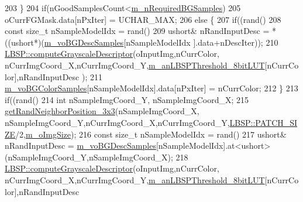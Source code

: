 \begin{DoxyCode}
203             \}
204             \textcolor{keywordflow}{if}(nGoodSamplesCount<\mbox{\hyperlink{class_background_subtractor_l_o_b_s_t_e_r_acb558aefc1b6205a63c1906b6fd1eeff}{m\_nRequiredBGSamples}})
205                 oCurrFGMask.data[nPxIter] = UCHAR\_MAX;
206             \textcolor{keywordflow}{else} \{
207                 \textcolor{keywordflow}{if}((rand()%
208                     \textcolor{keyword}{const} \textcolor{keywordtype}{size\_t} nSampleModelIdx = rand()%
209                     ushort& nRandInputDesc = *((ushort*)(\mbox{\hyperlink{class_background_subtractor_l_o_b_s_t_e_r_a3c49866ae652423b2173215957907d04}{m\_voBGDescSamples}}[nSampleModelIdx
      ].data+nDescIter));
210                     \mbox{\hyperlink{class_l_b_s_p_a4a5f635868b6b81ba53df2692ee3dfd8}{LBSP::computeGrayscaleDescriptor}}(oInputImg,nCurrColor,
      nCurrImgCoord\_X,nCurrImgCoord\_Y,\mbox{\hyperlink{class_background_subtractor_l_b_s_p_aefe69d94f08b2c4ba73ad1d254ad9153}{m\_anLBSPThreshold\_8bitLUT}}[nCurrColor],nRandInputDesc
      );
211                     \mbox{\hyperlink{class_background_subtractor_l_o_b_s_t_e_r_ac981b39f8ae7b28d3e4326d8e6be6332}{m\_voBGColorSamples}}[nSampleModelIdx].data[nPxIter] = nCurrColor;
212                 \}
213                 \textcolor{keywordflow}{if}((rand()%
214                     \textcolor{keywordtype}{int} nSampleImgCoord\_Y, nSampleImgCoord\_X;
215                     \mbox{\hyperlink{_rand_utils_8h_a76b18bef397ed044a6db9e3a63c69f69}{getRandNeighborPosition\_3x3}}(nSampleImgCoord\_X,
      nSampleImgCoord\_Y,nCurrImgCoord\_X,nCurrImgCoord\_Y,\mbox{\hyperlink{class_l_b_s_p_aa98abb79a155d3a2b416c2ab32e74929}{LBSP::PATCH\_SIZE}}/2,\mbox{\hyperlink{class_background_subtractor_l_b_s_p_a732d5e6ae35fb0e858cadb3af5ce08a2}{m\_oImgSize}});
216                     \textcolor{keyword}{const} \textcolor{keywordtype}{size\_t} nSampleModelIdx = rand()%
217                     ushort& nRandInputDesc = \mbox{\hyperlink{class_background_subtractor_l_o_b_s_t_e_r_a3c49866ae652423b2173215957907d04}{m\_voBGDescSamples}}[nSampleModelIdx].at<ushort>
      (nSampleImgCoord\_Y,nSampleImgCoord\_X);
218                     \mbox{\hyperlink{class_l_b_s_p_a4a5f635868b6b81ba53df2692ee3dfd8}{LBSP::computeGrayscaleDescriptor}}(oInputImg,nCurrColor,
      nCurrImgCoord\_X,nCurrImgCoord\_Y,\mbox{\hyperlink{class_background_subtractor_l_b_s_p_aefe69d94f08b2c4ba73ad1d254ad9153}{m\_anLBSPThreshold\_8bitLUT}}[nCurrColor],nRandInputDesc

\end{DoxyCode}
